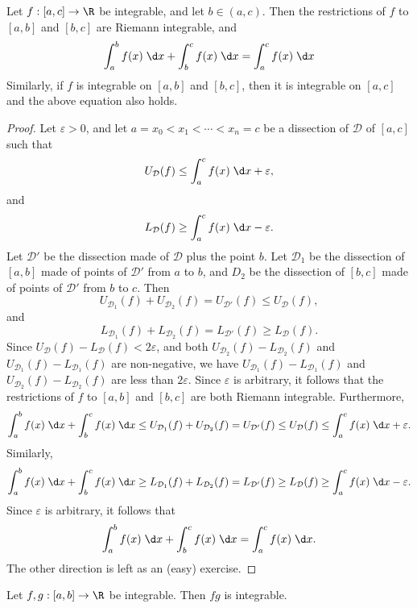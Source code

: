 \documentclass[a4paper]{article}
\begin{document}
\begin{prop}
  Let $f: [a, c] \to \R$ be integrable, and let $b\in (a, c)$. Then the restrictions of $f$ to $[a, b]$ and $[b, c]$ are Riemann integrable, and
  \[
    \int_a^b f(x)\;\d x + \int_b^c f(x)\;\d x = \int_a^c f(x) \;\d x
  \]
  Similarly, if $f$ is integrable on $[a, b]$ and $[b, c]$, then it is integrable on $[a, c]$ and the above equation also holds.
\end{prop}

\begin{proof}
  Let $\varepsilon> 0$, and let $a = x_0 < x_1 < \cdots < x_n = c$ be a dissection of $\mathcal{D}$ of $[a, c]$ such that
  \[
    U_\mathcal{D}(f) \leq \int_a^c f(x)\;\d x + \varepsilon,
  \]
  and
  \[
    L_\mathcal{D}(f) \geq \int_a^c f(x)\;\d x - \varepsilon.
  \]
  Let $\mathcal{D}'$ be the dissection made of $\mathcal{D}$ plus the point $b$. Let $\mathcal{D}_1$ be the dissection of $[a, b]$ made of points of $\mathcal{D}'$ from $a$ to $b$, and $D_2$ be the dissection of $[b, c]$ made of points of $\mathcal{D}'$ from $b$ to $c$. Then
  \[
    U_{\mathcal{D}_1}(f) + U_{\mathcal{D}_2}(f) = U_{\mathcal{D}'}(f) \leq U_{\mathcal{D}}(f),
  \]
  and
  \[
    L_{\mathcal{D}_1}(f) + L_{\mathcal{D}_2}(f) = L_{\mathcal{D}'}(f) \geq L_\mathcal{D} (f).
  \]
  Since $U_\mathcal{D}(f) - L_\mathcal{D}(f) < 2\varepsilon$, and both $U_{\mathcal{D}_2}(f) - L_{\mathcal{D}_2} (f)$ and $U_{\mathcal{D}_1}(f) - L_{\mathcal{D}_1} (f)$ are non-negative, we have $U_{\mathcal{D}_1} (f) - L_{\mathcal{D}_1} (f)$ and $U_{\mathcal{D}_2}(f) - L_{\mathcal{D}_2}(f)$ are less than $2\varepsilon$. Since $\varepsilon$ is arbitrary, it follows that the restrictions of $f$ to $[a, b]$ and $[b, c]$ are both Riemann integrable. Furthermore,
  \[
    \int_a^b f(x)\;\d x + \int_b^c f(x)\;\d x \leq U_{\mathcal{D}_1}(f) + U_{\mathcal{D}_2}(f) = U_{\mathcal{D}'}(f) \leq U_{\mathcal{D}}(f) \leq \int_a^c f(x)\;\d x + \varepsilon.
  \]
  Similarly,
  \[
    \int_a^bf(x)\;\d x + \int_b^cf(x)\;\d x \geq L_{\mathcal{D}_1}(f) + L_{\mathcal{D}_2}(f) = L_{\mathcal{D}'}(f) \geq L_{\mathcal{D}}(f) \geq \int_a^c f(x)\;\d x - \varepsilon.
  \]
  Since $\varepsilon$ is arbitrary, it follows that
  \[
    \int_a^b f(x)\;\d x + \int_b^c f(x)\;\d x = \int_a^c f(x)\;\d x.
  \]
  The other direction is left as an (easy) exercise.
\end{proof}

\begin{prop}
  Let $f, g: [a, b] \to \R$ be integrable. Then $fg$ is integrable.
\end{prop}
\end{document}
